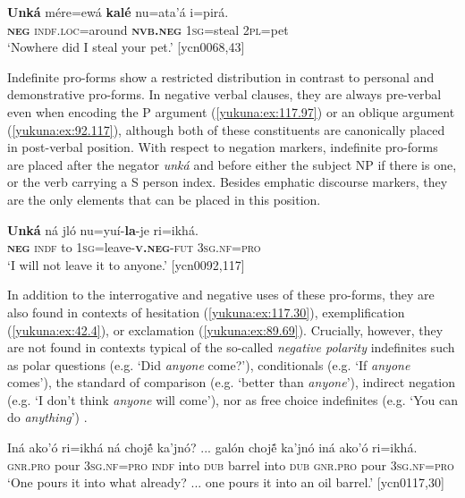 \documentclass[output=paper,colorlinks,citecolor=brown]{langscibook}
\begin{document}
\ea\label{yukuna:ex:68.124}
\gll \textbf{Unká} mére=ewá \textbf{kalé} nu=ata'á i=pirá. \\
\textbf{\textsc{neg}} \textsc{indf.loc}=around \textbf{\textsc{nvb.neg}} \textsc{1sg}=steal \textsc{2pl}=pet\\
\glt ‘Nowhere did I steal your pet.’ [ycn0068,43]
\z

Indefinite pro-forms show a restricted distribution in contrast to personal and demonstrative pro-forms. In negative verbal clauses, they are always pre-verbal even when encoding the P argument (\ref{yukuna:ex:117.97}) or an oblique argument (\ref{yukuna:ex:92.117}), although both of these constituents are canonically placed in post-verbal position. With respect to negation markers, indefinite pro-forms are placed after the negator \textit{unká} and before either the subject NP if there is one, or the verb carrying a S person index. Besides emphatic discourse markers, they are the only elements that can be placed in this position. 

\ea\label{yukuna:ex:92.117}
\gll \textbf{Unká} ná jló nu=yuí-\textbf{la}-je ri=ikhá. \\
\textbf{\textsc{neg}} \textsc{indf} to \textsc{1sg}=leave-\textbf{\textsc{v.neg}}-\textsc{fut} \textsc{3sg.nf}=\textsc{pro}\\
\glt ‘I will not leave it to anyone.’ [ycn0092,117]
\z

In addition to the interrogative and negative uses of these pro-forms, they are also found in contexts of hesitation (\ref{yukuna:ex:117.30}), exemplification (\ref{yukuna:ex:42.4}), or exclamation (\ref{yukuna:ex:89.69}). Crucially, however, they are not found in contexts typical of the so-called \textit{negative polarity} indefinites such as polar questions (e.g. ‘Did \textit{anyone} come?’), conditionals (e.g. ‘If \textit{anyone} comes’), the standard of comparison (e.g. ‘better than \textit{anyone}’), indirect negation (e.g. ‘I don't think \textit{anyone} will come’), nor as free choice indefinites (e.g. ‘You can do \textit{anything}’) \citep[37--53]{Haspelmath1997}.
 
\ea\label{yukuna:ex:117.30}
\gll Iná ako'ó ri=ikhá ná chojẽ́ ka'jnó? {...} galón chojẽ́ ka'jnó iná ako'ó ri=ikhá.\\
\textsc{gnr.pro} pour \textsc{3sg.nf=pro} \textsc{indf} into \textsc{dub} {} barrel into \textsc{dub} \textsc{gnr.pro} pour \textsc{3sg.nf=pro}\\
\glt ‘One pours it into what already? ... one pours it into an oil barrel.' [ycn0117,30]
\z%
\end{document}
